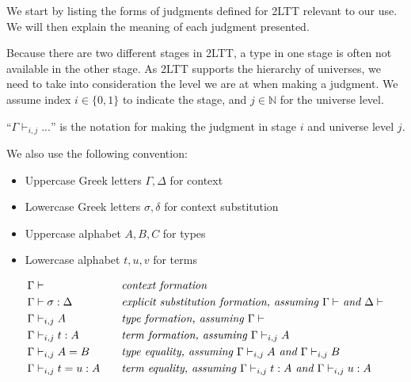 We start by listing the forms of judgments defined for 2LTT relevant to our use. We will then explain the meaning of each judgment presented. 

Because there are two different stages in 2LTT, a type in one stage is often not available in the other stage. As 2LTT supports the hierarchy of universes, we need to take into consideration the level we are at when making a judgment. We assume index $i \in \{0, 1\}$ to indicate the stage, and $j \in \mathbb N$ for the universe level. 
\begin{notation}
    ``$\Gamma \vdash_{i, j} ...$'' is the notation for making the judgment in stage $i$ and universe level $j$. 
\end{notation}
We also use the following convention:
\begin{itemize}
    \item Uppercase Greek letters $\Gamma, \Delta$ for context
    \item Lowercase Greek letters $\sigma, \delta$ for context substitution
    \item Uppercase alphabet $A, B, C$ for types
    \item Lowercase alphabet $t, u, v$ for terms
\end{itemize}

\begin{definition}
    \begin{alignat*}{2}
      & \Gamma\vdash\hspace{6em}           && \text{\emph{context formation}}\\
     & \Gamma\vdash \sigma : \Delta       && \text{\emph{explicit substitution formation, assuming $\Gamma \vdash$ and $\Delta \vdash$}}\\
      & \Gamma\vdash_{i,j} A                && \text{\emph{type formation, assuming $\Gamma\vdash$}}\\
      & \Gamma\vdash_{i,j} t : A            && \text{\emph{term formation, assuming $\Gamma \vdash_{i,j} A$}}\\
      & \Gamma \vdash_{i,j} A = B           && \text{\emph{type equality, assuming $\Gamma \vdash_{i,j} A$ and $\Gamma \vdash_{i,j} B$}}\\
      & \Gamma \vdash_{i,j} t = u : A       && \text{\emph{term equality, assuming $\Gamma \vdash_{i,j} t : A$ and $\Gamma \vdash_{i,j} u : A$}}
    \end{alignat*}
\end{definition}

